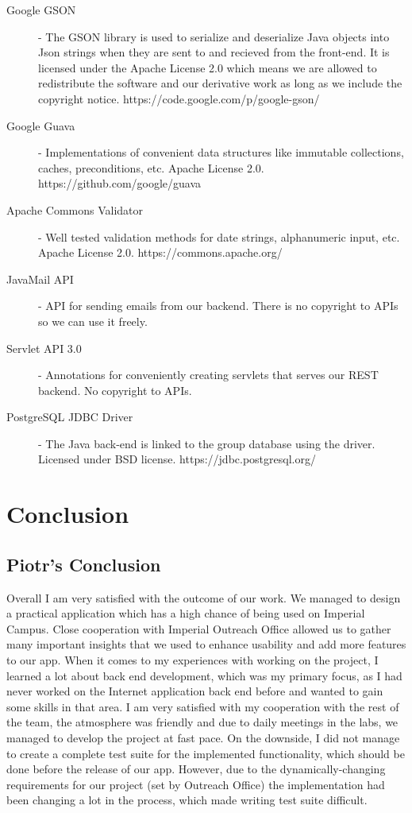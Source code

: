 \documentclass[10pt,a4paper]{article}
\begin{document}
\begin{description}
\item[Google GSON] - The GSON library is used to serialize and deserialize Java 
objects into Json strings when they are sent to and recieved from the front-end. 
It is licensed under the Apache License 2.0 which means we are allowed to redistribute
the software and our derivative work as long as we include the copyright notice.
https://code.google.com/p/google-gson/
\item[Google Guava] - Implementations of convenient data structures like immutable 
collections, caches, preconditions, etc. Apache License 2.0. https://github.com/google/guava
\item[Apache Commons Validator] - Well tested validation methods for date strings, 
alphanumeric input, etc. Apache License 2.0. https://commons.apache.org/
\item[JavaMail API] - API for sending emails from our backend. There is no
copyright to APIs so we can use it freely.
\item[Servlet API 3.0] - Annotations for conveniently creating servlets that
serves our REST backend. No copyright to APIs.
\item[PostgreSQL JDBC Driver] - The Java back-end is linked to the group 
database using the driver. Licensed under BSD license. 
https://jdbc.postgresql.org/
\end{description}

\section{Conclusion}
 \subsection{Piotr's Conclusion}
 Overall I am very satisfied with the outcome of our work. We managed to design 
a practical application which has a high chance of being used on Imperial 
Campus. Close cooperation with Imperial Outreach Office allowed us to gather 
many important insights that we used to enhance usability and add more features 
to our app. When it comes to my experiences with working on the project, I 
learned a lot about back end development, which was my primary focus, as I had 
never worked on the Internet application back end before and wanted to gain some 
skills in that area. I am very satisfied with my cooperation with the rest of 
the team, the atmosphere was friendly and due to daily meetings in the labs, we 
managed to develop the project at fast pace. On the downside, I did not manage 
to create a complete test suite for the implemented functionality, which should 
be done before the release of our app. However, due to the dynamically-changing 
requirements for our project (set by Outreach Office) the implementation had 
been changing a lot in the process, which made writing test suite difficult. 
 
\end{document}
